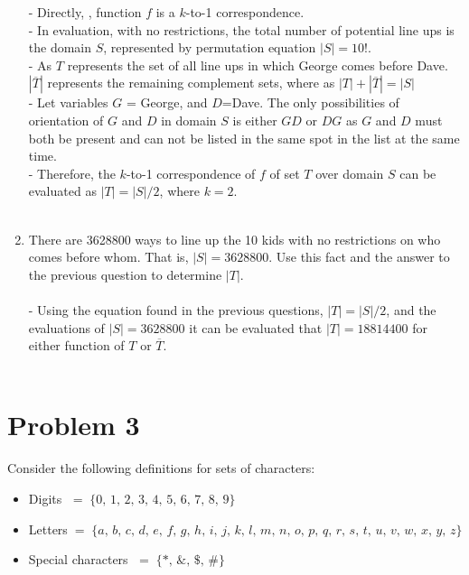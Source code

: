 \documentclass{amsart}
\theoremstyle{definition}
\theoremstyle{Exercise}
\theoremstyle{remark}
\theoremstyle{rule}
\numberwithin{equation}{section}
\begin{document}
\begin{enumerate}[label=(\alph*)]
  - Directly, , function $f$ is a $k$-to-1 correspondence.\\
  - In evaluation, with no restrictions, the total number of potential line ups is the domain $S$, represented by permutation equation $|S|=10!$.\\
  - As $T$ represents the set of all line ups in which George comes before Dave. $|\overline{T}|$ represents the remaining complement sets, where as $|T|+|\overline{T}|=|S|$\\
  - Let variables $G$ = George, and $D$=Dave. The only possibilities of orientation of $G$ and $D$ in domain $S$ is either $GD$ or $DG$ as $G$ and $D$ must both be present and can not be listed in the same spot in the list at the same time.\\
  - Therefore, the $k$-to-1 correspondence of $f$ of set $T$ over domain $S$ can be evaluated as $|T|=|S|/2$, where $k=2$.
\\\\
  \item There are 3628800 ways to line up the 10 kids with no restrictions on who comes before whom. That is, $|S| =3628800$. Use this fact and the answer to the previous question to determine $|T|$.\\\\
- Using the equation found in the previous questions, $|T|=|S|/2$, and the evaluations of $|S| = 3628800$ it can be evaluated that $|T| = 18814400$ for either function of $T$ or $\overline{T}$.
\\\\
\end{enumerate}

   
   \newpage
\vspace*{0.2in}
\section*{Problem 3}
   
   
Consider the following definitions for sets of characters:
\begin{itemize}
  \item Digits $\;=\; \{ 0,\, 1,\, 2,\, 3,\, 4,\, 5,\, 6,\, 7,\, 8,\, 9 \}$\\
  \item Letters$\; = \;\{ a,\, b,\, c, \,d,\, e,\, f,\, g,\, h,\, i,\, j,\, k,\, l,\, m,\, n,\, o,\, p,\, q,\, r,\, s,\, t,\, u,\, v,\, w,\, x,\, y,\, z \}$\\
  \item Special characters $\;=\; \{ *,\, \&,\, \$,\, \# \}$\\
\end{itemize}
\end{document}

